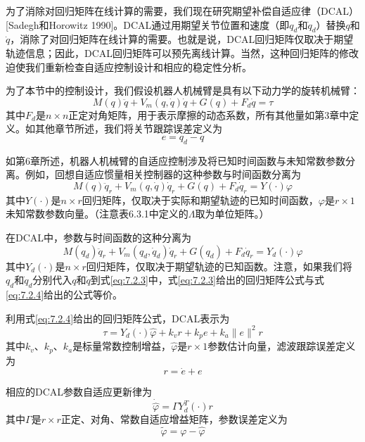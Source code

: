 \documentclass[UTF8]{ctexart}
\begin{document}
为了消除对回归矩阵在线计算的需要，我们现在研究期望补偿自适应律（DCAL）[Sadegh和Horowitz 1990]。DCAL通过用期望关节位置和速度（即$q_d$和$\dot{q}_d$）替换$q$和$\dot{q}$，消除了对回归矩阵在线计算的需要。也就是说，DCAL回归矩阵仅取决于期望轨迹信息；因此，DCAL回归矩阵可以预先离线计算。当然，这种回归矩阵的修改迫使我们重新检查自适应控制设计和相应的稳定性分析。

为了本节中的控制设计，我们假设机器人机械臂是具有以下动力学的旋转机械臂：
\begin{equation}\label{eq:7.2.1}
M(q)\ddot{q} + V_m(q,\dot{q})\dot{q} + G(q) + F_d\dot{q} = \tau
\end{equation}
其中$F_d$是$n \times n$正定对角矩阵，用于表示摩擦的动态系数，所有其他量如第3章中定义。如其他章节所述，我们将关节跟踪误差定义为
\begin{equation}\label{eq:7.2.2}
e = q_d - q
\end{equation}

如第6章所述，机器人机械臂的自适应控制涉及将已知时间函数与未知常数参数分离。例如，回想自适应惯量相关控制器的这种参数与时间函数分离为
\begin{equation}\label{eq:7.2.3}
M(q)\ddot{q}_r + V_m(q,\dot{q})\dot{q}_r + G(q) + F_d\dot{q}_r = Y(\cdot)\varphi
\end{equation}
其中$Y(\cdot)$是$n \times r$回归矩阵，仅取决于实际和期望轨迹的已知时间函数，$\varphi$是$r \times 1$未知常数参数向量。（注意表6.3.1中定义的$\Lambda$取为单位矩阵。）

在DCAL中，参数与时间函数的这种分离为
\begin{equation}\label{eq:7.2.4}
M(q_d)\ddot{q}_r + V_m(q_d,\dot{q}_d)\dot{q}_r + G(q_d) + F_d\dot{q}_r = Y_d(\cdot)\varphi
\end{equation}
其中$Y_d(\cdot)$是$n \times r$回归矩阵，仅取决于期望轨迹的已知函数。注意，如果我们将$q_d$和$\dot{q}_d$分别代入$q$和$\dot{q}$到式\eqref{eq:7.2.3}中，式\eqref{eq:7.2.3}给出的回归矩阵公式与式\eqref{eq:7.2.4}给出的公式等价。

利用式\eqref{eq:7.2.4}给出的回归矩阵公式，DCAL表示为
\begin{equation}\label{eq:7.2.5}
\tau = Y_d(\cdot)\hat{\varphi} + k_v r + k_p e + k_a \|e\|^2 r
\end{equation}
其中$k_v$、$k_p$、$k_a$是标量常数控制增益，$\hat{\varphi}$是$r \times 1$参数估计向量，滤波跟踪误差定义为
\begin{equation}\label{eq:7.2.6}
r = \dot{e} + e
\end{equation}

相应的DCAL参数自适应更新律为
\begin{equation}\label{eq:7.2.7}
\dot{\hat{\varphi}} = \Gamma Y_d^T(\cdot) r
\end{equation}
其中$\Gamma$是$r \times r$正定、对角、常数自适应增益矩阵，参数误差定义为
\begin{equation}\label{eq:7.2.8}
\tilde{\varphi} = \varphi - \hat{\varphi}
\end{equation}
\end{document}
